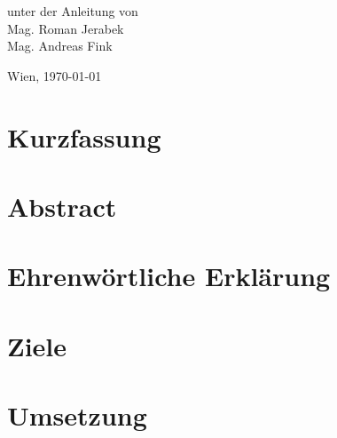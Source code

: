\documentclass[
    headings=optiontotocandhead,%
    twoside,
    numbers=noenddot,%
    toc=flat, %
    12pt, %
    titlepage, %
    parskip=full, %
    listof=totoc, %
    listof=flat, %
    numbers=noenddot, %
    bibliography=totoc, %
    a4paper,DIV=14,
    BCOR=15mm,
]{scrbook}
\begin{document}
\begin{titlepage}
\begin{center}
\vspace{20mm}
 \normalsize unter der Anleitung von\\
 \vspace{0.5cm}
 Mag. Roman Jerabek\\
 Mag. Andreas Fink
\par\end{center}

\begin{center}
\vspace{5mm}
Wien, \today 
\par\end{center}

\end{titlepage}%

\chapter*{Kurzfassung}


\chapter*{Abstract}


\chapter*{Ehrenwörtliche Erklärung}


\cleardoublepage{}
\tableofcontents{}
\cleardoublepage{}
\listoftables
\cleardoublepage{}
\listoffigures

\cleardoublepage{}
\mainmatter

\chapter{Ziele}

\chapter{Umsetzung}

\end{document}

